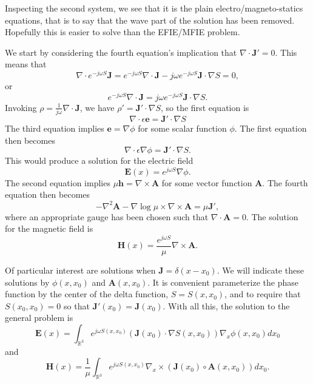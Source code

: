\documentclass{article}
\newcommand{\Div}[0]{\nabla\cdot}
\newcommand{\Curl}[0]{\nabla\times}
\theoremstyle{plain}
\begin{document}
Inspecting the second system, we see that it is the plain electro/magneto-statics equations, that is to say that the wave part of the solution has been removed. Hopefully this is easier to solve than the EFIE/MFIE problem.

We start by considering the fourth equation's implication that $\Div\mathbf{J}'=0$. This means that
\begin{equation}
	\Div e^{-j\omega S}\mathbf{J} = e^{-j\omega S}\Div\mathbf{J} - j\omega e^{-j\omega S}\mathbf{J}\cdot\nabla S = 0,
\end{equation}
or
\begin{equation}
	e^{-j\omega S}\Div\mathbf{J} = j\omega e^{-j\omega S}\mathbf{J}\cdot\nabla S.
\end{equation}
Invoking $\rho = \frac{1}{j\omega}\Div\mathbf{J}$, we have $\rho' = \mathbf{J}'\cdot\nabla S$, so the first equation is
\begin{equation}
	\Div\epsilon\mathbf{e} = \mathbf{J}'\cdot\nabla S
\end{equation}
The third equation implies $\mathbf{e} = \nabla\phi$ for some scalar function $\phi$. The first equation then becomes
\begin{equation}
	\Div\epsilon\nabla\phi = \mathbf{J}'\cdot\nabla S.
\end{equation}
This would produce a solution for the electric field
\begin{equation}
	\mathbf{E}(x) = e^{j\omega S}\nabla\phi.
\end{equation}
The second equation implies $\mu\mathbf{h} = \Curl\mathbf{A}$ for some vector function $\mathbf{A}$. The fourth equation then becomes
\begin{equation}
	-\nabla^2\mathbf{A} -\nabla\log{\mu}\times\Curl\mathbf{A} = \mu\mathbf{J}',
\end{equation}
where an appropriate gauge has been chosen such that $\Div\mathbf{A}=0$. The solution for the magnetic field is
\begin{equation}
	\mathbf{H}(x) = \frac{e^{j\omega S}}{\mu}\Curl\mathbf{A}.
\end{equation}


Of particular interest are solutions when $\mathbf{J} = \delta(x-x_0)$. We will indicate these solutions by $\phi(x,x_0)$ and $\mathbf{A}(x,x_0)$. It is convenient parameterize the phase function by the center of the delta function, $S=S(x,x_0)$, and to require that $S(x_0,x_0)=0$ so that $\mathbf{J}'(x_0)=\mathbf{J}(x_0)$. With all this, the solution to the general problem is
\begin{equation}
	\mathbf{E}(x) = \int_{\mathbb{R}^3} e^{j\omega S(x,x_0)} \left( \mathbf{J}(x_0)\cdot\nabla S(x,x_0) \right)\nabla_x\phi(x,x_0) dx_0
\end{equation}
and
\begin{equation}
	\mathbf{H}(x) = \frac{1}{\mu}\int_{\mathbb{R}^3} e^{j\omega S(x,x_0)}\nabla_x\times\left( \mathbf{J}(x_0)\circ\mathbf{A}(x,x_0) \right) dx_0.
\end{equation}
\end{document}
